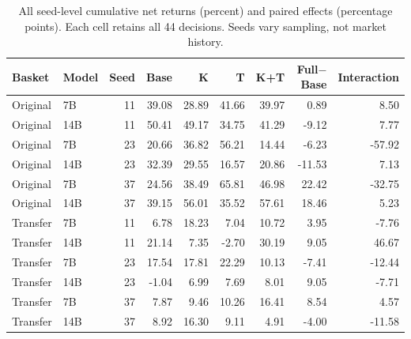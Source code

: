 \begin{table}[t]
\centering\small
\setlength{\tabcolsep}{4pt}
\begin{tabular}{llrrrrrrr}
\toprule
Basket & Model & Seed & Base & K & T & K+T & Full$-$Base & Interaction \\
\midrule
Original & 7B & 11 & 39.08 & 28.89 & 41.66 & 39.97 & 0.89 & 8.50 \\
Original & 14B & 11 & 50.41 & 49.17 & 34.75 & 41.29 & -9.12 & 7.77 \\
Original & 7B & 23 & 20.66 & 36.82 & 56.21 & 14.44 & -6.23 & -57.92 \\
Original & 14B & 23 & 32.39 & 29.55 & 16.57 & 20.86 & -11.53 & 7.13 \\
Original & 7B & 37 & 24.56 & 38.49 & 65.81 & 46.98 & 22.42 & -32.75 \\
Original & 14B & 37 & 39.15 & 56.01 & 35.52 & 57.61 & 18.46 & 5.23 \\
Transfer & 7B & 11 & 6.78 & 18.23 & 7.04 & 10.72 & 3.95 & -7.76 \\
Transfer & 14B & 11 & 21.14 & 7.35 & -2.70 & 30.19 & 9.05 & 46.67 \\
Transfer & 7B & 23 & 17.54 & 17.81 & 22.29 & 10.13 & -7.41 & -12.44 \\
Transfer & 14B & 23 & -1.04 & 6.99 & 7.69 & 8.01 & 9.05 & -7.71 \\
Transfer & 7B & 37 & 7.87 & 9.46 & 10.26 & 16.41 & 8.54 & 4.57 \\
Transfer & 14B & 37 & 8.92 & 16.30 & 9.11 & 4.91 & -4.00 & -11.58 \\
\bottomrule
\end{tabular}
\caption{All seed-level cumulative net returns (percent) and paired effects (percentage points). Each cell retains all 44 decisions. Seeds vary sampling, not market history.}
\label{tab:factorial-seeds}
\end{table}

